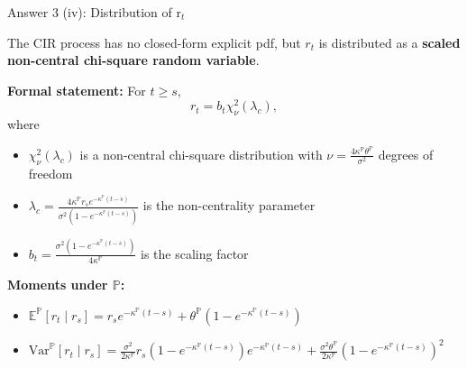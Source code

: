 \documentclass[compress]{beamer}
\begin{document}
\begin{frame}{Answer 3 (iv): Distribution of r$_t$}
    \small
    
    The CIR process has no closed-form explicit pdf, but $r_t$ is distributed as a \textbf{scaled non-central chi-square random variable}.
    
    \vspace{1em}
    
    \textbf{Formal statement:} For $t \geq s$,
    \[
        r_t = b_t \chi^2_{\nu}(\lambda_c),
    \]
    where
    \begin{itemize}
        \item $\chi^2_{\nu}(\lambda_c)$ is a non-central chi-square distribution with $\nu = \frac{4\kappa^{\mathbb{P}}\theta^{\mathbb{P}}}{\sigma^2}$ degrees of freedom
        \item $\lambda_c = \frac{4\kappa^{\mathbb{P}} r_s e^{-\kappa^{\mathbb{P}}(t-s)}}{\sigma^2(1 - e^{-\kappa^{\mathbb{P}}(t-s)})}$ is the non-centrality parameter
        \item $b_t = \frac{\sigma^2(1 - e^{-\kappa^{\mathbb{P}}(t-s)})}{4\kappa^{\mathbb{P}}}$ is the scaling factor
    \end{itemize}
    
    \vspace{1em}
    
    \textbf{Moments under $\mathbb{P}$:}
    \begin{itemize}
        \item $\mathbb{E}^{\mathbb{P}}[r_t \mid r_s] = r_s e^{-\kappa^{\mathbb{P}}(t-s)} + \theta^{\mathbb{P}}(1 - e^{-\kappa^{\mathbb{P}}(t-s)})$
        \item $\text{Var}^{\mathbb{P}}[r_t \mid r_s] = \frac{\sigma^2}{2\kappa^{\mathbb{P}}}r_s(1 - e^{-\kappa^{\mathbb{P}}(t-s)})e^{-\kappa^{\mathbb{P}}(t-s)} + \frac{\sigma^2\theta^{\mathbb{P}}}{2\kappa^{\mathbb{P}}}(1 - e^{-\kappa^{\mathbb{P}}(t-s)})^2$
    \end{itemize}
\end{frame}
\end{document}
